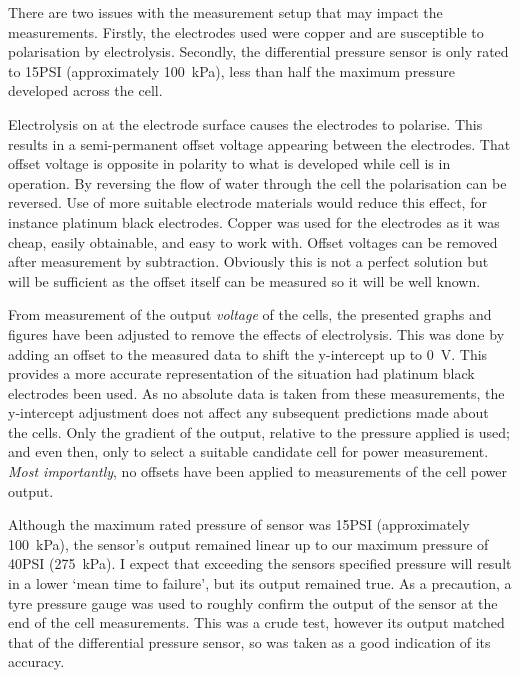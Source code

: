     There are two issues with the measurement setup that may impact the measurements.
    Firstly, the electrodes used were copper and are susceptible to polarisation by electrolysis.
    Secondly, the differential pressure sensor is only rated to 15\thinspace PSI (approximately \SI{100}{\kilo\pascal}), less than half the maximum pressure developed across the cell.

    Electrolysis on at the electrode surface causes the electrodes to polarise.
    This results in a semi-permanent offset voltage appearing between the electrodes.
    That offset voltage is opposite in polarity to what is developed while cell is in operation.
    By reversing the flow of water through the cell the polarisation can be reversed.
    Use of more suitable electrode materials would reduce this effect, for instance platinum black electrodes.
    Copper was used for the electrodes as it was cheap, easily obtainable, and easy to work with.
    Offset voltages can be removed after measurement by subtraction.
    Obviously this is not a perfect solution but will be sufficient as the offset itself can be measured so it will be well known.

    From measurement of the output \emph{voltage} of the cells, the presented graphs and figures have been adjusted to remove the effects of electrolysis.
    This was done by adding an offset to the measured data to shift the y-intercept up to \SI{0}{\volt}.
    This provides a more accurate representation of the situation had platinum black electrodes been used.
    As no absolute data is taken from these measurements, the y-intercept adjustment does not affect any subsequent predictions made about the cells.
    Only the gradient of the output, relative to the pressure applied is used; and even then, only to select a suitable candidate cell for power measurement.
    \emph{Most importantly}, no offsets have been applied to measurements of the cell power output.

    Although the maximum rated pressure of sensor was 15\thinspace PSI (approximately \SI{100}{\kilo\pascal}), the sensor's output remained linear up to our maximum pressure of 40\thinspace PSI (\SI{275}{\kilo\pascal}).
    I expect that exceeding the sensors specified pressure will result in a lower `mean time to failure', but its output remained true.
    As a precaution, a tyre pressure gauge was used to roughly confirm the output of the sensor at the end of the cell measurements.
    This was a crude test, however its output matched that of the differential pressure sensor, so was taken as a good indication of its accuracy.


